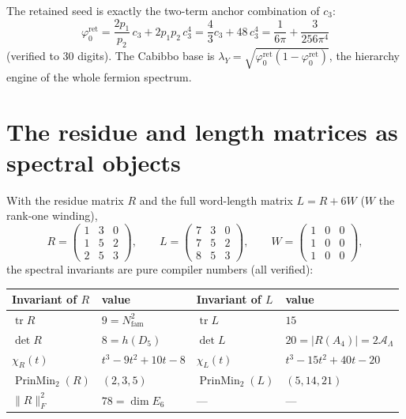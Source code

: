 \documentclass[11pt,a4paper]{article}
\newcommand{\Nfam}{N_{\mathrm{fam}}}
\newcommand{\cthree}{c_3}
\newcommand{\phiz}{\varphi_0^{\mathrm{ret}}}
\newcommand{\AL}{\mathcal A_\Lambda}
\theoremstyle{definition}
\renewcommand{\arraystretch}{1.15}
\begin{document}
\begin{winbox}
The retained seed is exactly the two-term anchor combination of $\cthree$:
\[
  \boxed{\ \phiz=\frac{2p_1}{p_2}\,\cthree+2p_1p_2\,\cthree^4=\frac43\cthree+48\,\cthree^4
  =\frac1{6\pi}+\frac{3}{256\pi^4}\ }
\]
(verified to $30$ digits). The Cabibbo base is $\lambda_Y=\sqrt{\phiz(1-\phiz)}$, the hierarchy engine
of the whole fermion spectrum. \mE
\end{winbox}

\section{The residue and length matrices as spectral objects}
With the residue matrix $R$ and the full word-length matrix $L=R+6W$ ($W$ the rank-one winding),
\[
  R=\begin{pmatrix}1&3&0\\1&5&2\\2&5&3\end{pmatrix},\qquad
  L=\begin{pmatrix}7&3&0\\7&5&2\\8&5&3\end{pmatrix},\qquad
  W=\begin{pmatrix}1&0&0\\1&0&0\\1&0&0\end{pmatrix},
\]
the spectral invariants are pure compiler numbers (all verified):
\begin{center}\small
\renewcommand{\arraystretch}{1.25}
\begin{tabularx}{\linewidth}{@{}lYlY@{}}
\toprule
\textbf{Invariant of $R$} & \textbf{value} & \textbf{Invariant of $L$} & \textbf{value} \\
\midrule
$\operatorname{tr}R$ & $9=\Nfam^2$ & $\operatorname{tr}L$ & $15$ \\
$\det R$ & $8=h(D_5)$ & $\det L$ & $20=|R(A_4)|=2\AL$ \\
$\chi_R(t)$ & $t^3-9t^2+10t-8$ & $\chi_L(t)$ & $t^3-15t^2+40t-20$ \\
$\operatorname{PrinMin}_2(R)$ & $(2,3,5)$ & $\operatorname{PrinMin}_2(L)$ & $(5,14,21)$ \\
$\|R\|_F^2$ & $78=\dim E_6$ & --- & --- \\
\bottomrule
\end{tabularx}
\end{center}
\end{document}
